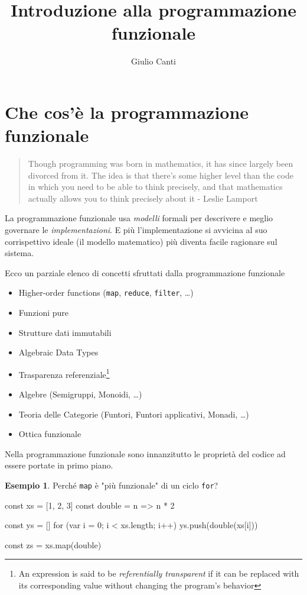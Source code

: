 \documentclass[12pt]{article}
\title{
  Introduzione alla programmazione funzionale
}
\author{Giulio Canti}
\theoremstyle{definition}
\newtheorem{example}{Esempio}[section]
\newenvironment{code}
  {\vspace{0.5cm} \VerbatimEnvironment\begin{typescriptcode}}
  {\end{typescriptcode} \vspace{0.2cm}}
\begin{document}
\maketitle

\tableofcontents

\newpage
\section{Che cos'è la programmazione funzionale}

\begin{quote}
Though programming was born in mathematics, it has since largely been divorced from it.
The idea is that there's some higher level than the code in which you need to be able to think precisely,
and that mathematics actually allows you to think precisely about it - Leslie Lamport
\end{quote}

La programmazione funzionale usa \emph{modelli} formali per descrivere e meglio governare le \emph{implementazioni}.
E più l'implementazione si avvicina al suo corrispettivo ideale (il modello matematico)
più diventa facile ragionare sul sistema.

Ecco un parziale elenco di concetti sfruttati dalla programmazione funzionale

\begin{itemize}
  \item Higher-order functions (\texttt{map}, \texttt{reduce}, \texttt{filter},  \ldots)
  \item Funzioni pure
  \item Strutture dati immutabili
  \item Algebraic Data Types
  \item Trasparenza referenziale\footnote{An expression is said to be \emph{referentially transparent} if it can be replaced with its corresponding value without changing the program's behavior}
  \item Algebre (Semigruppi, Monoidi, \ldots)
  \item Teoria delle Categorie (Funtori, Funtori applicativi, Monadi, \ldots)
  \item Ottica funzionale
\end{itemize}

Nella programmazione funzionale sono innanzitutto le proprietà del codice ad essere portate in primo piano.

\begin{example}
Perché \texttt{map} è "più funzionale" di un ciclo \texttt{for}?

\begin{code}
const xs = [1, 2, 3]
const double = n => n * 2

const ys = []
for (var i = 0; i < xs.length; i++) {
  ys.push(double(xs[i]))
}

const zs = xs.map(double)
\end{code}

\end{example}
\end{document}
